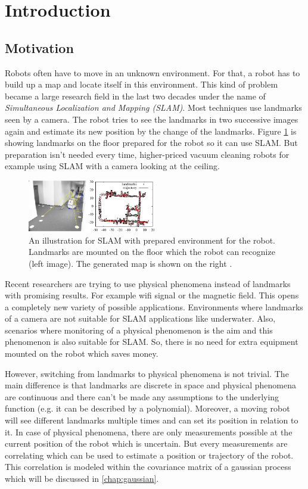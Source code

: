 \section{Introduction}
\subsection{Motivation}
Robots often have to move in an unknown environment. For that, a robot has to build up a map
and locate itself in this environment. This kind of problem became a large research
field in the last two decades under the name of \textit{Simultaneous Localization and Mapping
(SLAM)}. Most techniques use landmarks seen by a camera. The robot tries
to see the landmarks in two successive images again and estimate its new position by the change
of the landmarks. Figure \ref{fig:grisetti_slam_example} is showing landmarks on the floor prepared 
for the robot so it can use SLAM. But preparation isn't needed every time, higher-priced vacuum cleaning 
robots for example using SLAM with a camera looking at the ceiling.

\begin{figure}[h!]
	\centering
	\includegraphics[width=0.5\textwidth]{images/grisetti_slam_example.png}
	\caption{
		An illustration for SLAM with prepared environment for the robot.
		Landmarks are mounted on the floor which the robot can recognize (left image).
		The generated map is shown on the right \cite{grisetti_tutorial_2010}.
		}
	\label{fig:grisetti_slam_example}
\end{figure}

Recent researchers are trying to use physical phenomena instead of landmarks with promising results. 
For example wifi signal or the magnetic field. This opens a completely new variety of possible applications. 
Environments where landmarks of a camera are not suitable for SLAM applications like underwater. Also, scenarios 
where monitoring of a physical phenomenon is the aim and this phenomenon is also suitable for SLAM. So, there
is no need for extra equipment mounted on the robot which saves money.

However, switching from landmarks to physical phenomena is not trivial. The main difference is that landmarks
are discrete in space and physical phenomena are continuous and there can't be made any assumptions to the
underlying function (e.g. it can be described by a polynomial). Moreover, a moving robot will see different
landmarks multiple times and can set its position in relation to it. In case of physical phenomena,
there are only measurements possible at the current position of the robot which is uncertain. But every 
measurements are correlating which can be used to estimate a position or trajectory of the robot. This 
correlation is modeled within the covariance matrix of a gaussian process which will be discussed in 
\ref{chap:gaussian}.